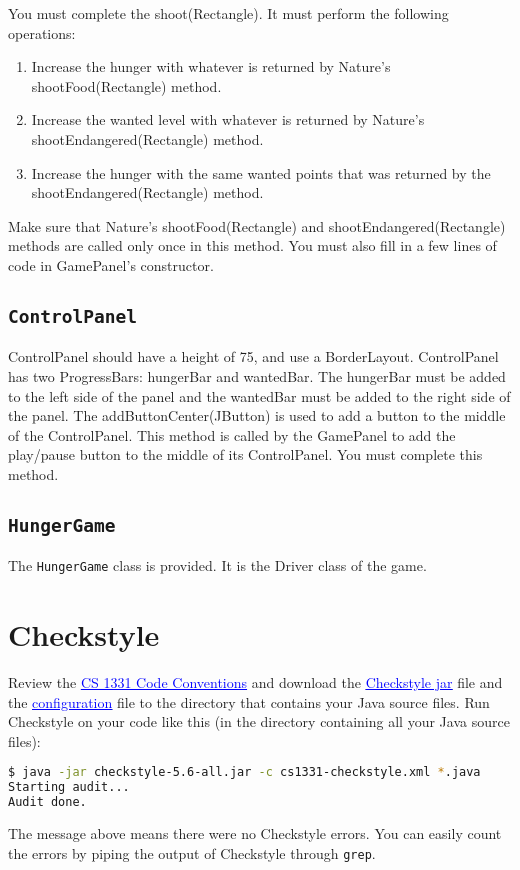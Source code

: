 \documentclass[12pt]{article}
\newcommand{\link}[2]{\href{#1}{\textcolor{blue}{\underline{#2}}} }
\newcommand{\codeconventions}{\link{http://www.cc.gatech.edu/~simpkins/teaching/gatech/cs1331/guides/cs1331-code-conventions.html}{CS 1331 Code Conventions}}
\newcommand{\checkstylejar}{\link{http://www.cc.gatech.edu/~simpkins/teaching/gatech/cs1331/guides/checkstyle-5.6-all.jar}{Checkstyle jar}}
\newcommand{\checkstyleconfig}[0]{\link{http://www.cc.gatech.edu/~simpkins/teaching/gatech/cs1331/guides/cs1331-checkstyle.xml}{configuration}}
\begin{document}
You must complete the shoot(Rectangle).  It must perform the following operations:
\begin{enumerate}
    \item Increase the hunger with whatever is returned by Nature's shootFood(Rectangle) method.
    \item Increase the wanted level with whatever is returned by Nature's shootEndangered(Rectangle) method.
    \item Increase the hunger with the same wanted points that was returned by the shootEndangered(Rectangle) method.
    \end{enumerate}
Make sure that Nature's shootFood(Rectangle) and shootEndangered(Rectangle) methods are called only once in this method.
You must also fill in a few lines of code in GamePanel's constructor.

\subsection{{\tt ControlPanel}}

ControlPanel should have a height of 75, and use a BorderLayout.
ControlPanel has two ProgressBars: hungerBar and wantedBar.
The hungerBar must be added to the left side of the panel and the wantedBar must be added to the right side of the panel.
The addButtonCenter(JButton) is used to add a button to the middle of the ControlPanel.  This method is called by the GamePanel to add the play/pause button to the middle of its ControlPanel.  You must complete this method.

\subsection{{\tt HungerGame}}

The {\tt HungerGame} class is provided.  It is the Driver class of the game.

\newpage


\section{Checkstyle}

Review the \codeconventions and download the \checkstylejar file and the \checkstyleconfig file to the directory that contains your Java source files.  Run Checkstyle on your code like this (in the directory containing all your Java source files):

\begin{lstlisting}[language=bash]
$ java -jar checkstyle-5.6-all.jar -c cs1331-checkstyle.xml *.java
Starting audit...
Audit done.
\end{lstlisting}
The message above means there were no Checkstyle errors.  You can easily count the errors by piping the output of Checkstyle through {\tt grep}.
\end{document}
